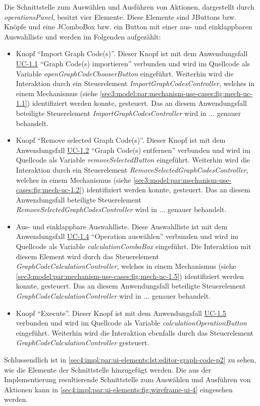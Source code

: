 Die Schnittstelle zum Auswählen und Ausführen von Aktionen, dargestellt durch \textit{operationsPanel}, besitzt vier Elemente.
Diese Elemente sind JButtons bzw. Knöpfe und eine JComboBox bzw. ein Button mit einer aus- und einklappbaren Auswahlliste und werden im Folgenden aufgezählt:
\begin{itemize}
  \item Knopf \enquote{Import Graph Code(s)}.
  Dieser Knopf ist mit dem Anwendungsfall \hyperref[sec3:model:uc-1.1]{UC-1.1} \enquote{Graph Code(s) importieren} verbunden und wird im Quellcode als Variable \textit{openGraphCodeChooserButton} eingeführt.
  Weiterhin wird die Interaktion durch ein Steuerelement \textit{ImportGraphCodesController}, welches in einem Mechanismus (siehe \cref{sec3:model:par:mechanism-use-cases:fig:mech-uc-1.1}) identifiziert werden konnte, gesteuert.
  Das an diesem Anwendungsfall beteiligte Steuerelement \textit{ImportGraphCodesController} wird in ... genauer behandelt.
  \item Knopf \enquote{Remove selected Graph Code(s)}.
  Dieser Knopf ist mit dem Anwendungsfall \hyperref[sec3:model:uc-1.2]{UC-1.2} \enquote{Graph Code(s) entfernen} verbunden und wird im Quellcode als Variable \textit{removeSelectedButton} eingeführt.
  Weiterhin wird die Interaktion durch ein Steuerelement \textit{RemoveSelectedGraphCodesController}, welches in einem Mechanismus (siehe \cref{sec3:model:par:mechanism-use-cases:fig:mech-uc-1.2}) identifiziert werden konnte, gesteuert.
  Das an diesem Anwendungsfall beteiligte Steuerelement \textit{RemoveSelectedGraphCodesController} wird in ... genauer behandelt.
  \item Aus- und einklappbare Auswahlliste.
  Diese Auswahlliste ist mit dem Anwendungsfall \hyperref[sec3:model:uc-1.4]{UC-1.4} \enquote{Operation auswählen} verbunden und wird im Quellcode als Variable \textit{calculationComboBox} eingeführt.
  Die Interaktion mit diesem Element wird durch das Steuerelement \textit{GraphCodeCalculationController}, welches in einem Mechanismus (siehe \cref{sec3:model:par:mechanism-use-cases:fig:mech-uc-1.5}) identifiziert werden konnte, gesteuert.
  Das an diesem Anwendungsfall beteiligte Steuerelement \textit{GraphCodeCalculationController} wird in ... genauer behandelt.
  \item Knopf \enquote{Execute}.
  Dieser Knopf ist mit dem Anwendungsfall \hyperref[sec3:model:uc-1.5]{UC-1.5} verbunden und wird im Quellcode als Variable \textit{calculationOperationButton} eingeführt.
  Weiterhin wird die Interaktion ebenfalls durch das Steuerelement \textit{GraphCodeCalculationController} gesteuert.
\end{itemize}
Schlussendlich ist in \cref{sec4:impl:par:ui-elements:lst:editor-graph-code-p2} zu sehen, wie die Elemente der Schnittstelle hinzugefügt werden.
Die aus der Implementierung resultierende Schnittstelle zum Auswählen und Ausführen von Aktionen kann in \cref{sec4:impl:par:ui-elements:fig:wireframe-ui-4} eingesehen werden.

